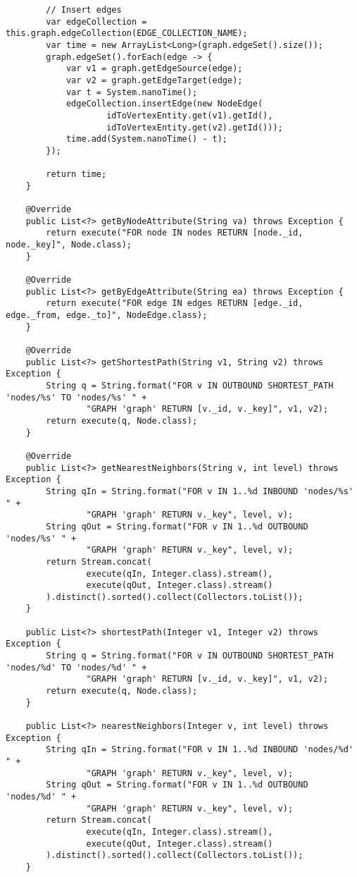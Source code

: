 \begin{lstlisting}
        // Insert edges
        var edgeCollection = this.graph.edgeCollection(EDGE_COLLECTION_NAME);
        var time = new ArrayList<Long>(graph.edgeSet().size());
        graph.edgeSet().forEach(edge -> {
            var v1 = graph.getEdgeSource(edge);
            var v2 = graph.getEdgeTarget(edge);
            var t = System.nanoTime();
            edgeCollection.insertEdge(new NodeEdge(
                    idToVertexEntity.get(v1).getId(),
                    idToVertexEntity.get(v2).getId()));
            time.add(System.nanoTime() - t);
        });

        return time;
    }

    @Override
    public List<?> getByNodeAttribute(String va) throws Exception {
        return execute("FOR node IN nodes RETURN [node._id, node._key]", Node.class);
    }

    @Override
    public List<?> getByEdgeAttribute(String ea) throws Exception {
        return execute("FOR edge IN edges RETURN [edge._id, edge._from, edge._to]", NodeEdge.class);
    }

    @Override
    public List<?> getShortestPath(String v1, String v2) throws Exception {
        String q = String.format("FOR v IN OUTBOUND SHORTEST_PATH 'nodes/%s' TO 'nodes/%s' " +
                "GRAPH 'graph' RETURN [v._id, v._key]", v1, v2);
        return execute(q, Node.class);
    }

    @Override
    public List<?> getNearestNeighbors(String v, int level) throws Exception {
        String qIn = String.format("FOR v IN 1..%d INBOUND 'nodes/%s' " +
                "GRAPH 'graph' RETURN v._key", level, v);
        String qOut = String.format("FOR v IN 1..%d OUTBOUND 'nodes/%s' " +
                "GRAPH 'graph' RETURN v._key", level, v);
        return Stream.concat(
                execute(qIn, Integer.class).stream(),
                execute(qOut, Integer.class).stream()
        ).distinct().sorted().collect(Collectors.toList());
    }

    public List<?> shortestPath(Integer v1, Integer v2) throws Exception {
        String q = String.format("FOR v IN OUTBOUND SHORTEST_PATH 'nodes/%d' TO 'nodes/%d' " +
                "GRAPH 'graph' RETURN [v._id, v._key]", v1, v2);
        return execute(q, Node.class);
    }

    public List<?> nearestNeighbors(Integer v, int level) throws Exception {
        String qIn = String.format("FOR v IN 1..%d INBOUND 'nodes/%d' " +
                "GRAPH 'graph' RETURN v._key", level, v);
        String qOut = String.format("FOR v IN 1..%d OUTBOUND 'nodes/%d' " +
                "GRAPH 'graph' RETURN v._key", level, v);
        return Stream.concat(
                execute(qIn, Integer.class).stream(),
                execute(qOut, Integer.class).stream()
        ).distinct().sorted().collect(Collectors.toList());
    }


\end{lstlisting}
